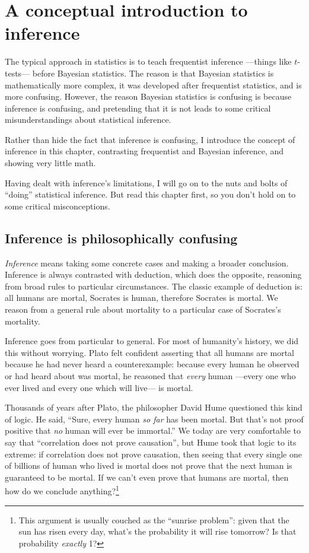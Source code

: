 
\chapter{A conceptual introduction to inference}

The typical approach in statistics is to teach frequentist inference ---things like $t$-tests--- before Bayesian statistics. The reason is that Bayesian statistics is mathematically more complex, it was developed after frequentist statistics, and is more confusing. However, the reason Bayesian statistics is confusing is because inference is confusing, and pretending that it is not leads to some critical misunderstandings about statistical inference.

Rather than hide the fact that inference is confusing, I introduce the concept of inference in this chapter, contrasting frequentist and Bayesian inference, and showing very little math.

Having dealt with inference's limitations, I will go on to the nuts and bolts of ``doing'' statistical inference. But read this chapter first, so you don't hold on to some critical misconceptions.

\section{Inference is philosophically confusing}

\emph{Inference} means taking some concrete cases and making a broader
conclusion. Inference is always contrasted with deduction, which does the
opposite, reasoning from broad rules to particular circumstances. The classic
example of deduction is: all humans are mortal, Socrates is human, therefore
Socrates is mortal. We reason from a general rule about mortality to
a particular case of Socrates's mortality.

Inference goes from particular to general. For most of humanity's history, we
did this without worrying. Plato felt confident asserting that all humans are
mortal because he had never heard a counterexample: because every human he
observed or had heard about was mortal, he reasoned that \emph{every} human ---every one who ever lived and every one which will live--- is mortal.

Thousands of years after Plato, the philosopher David Hume questioned this kind of logic. He said, ``Sure, every human \emph{so far} has been mortal. But that's not proof positive that \emph{no} human will ever be immortal.'' We today are very comfortable to say that ``correlation does not prove causation'', but Hume took that logic to its extreme: if correlation does not prove causation, then seeing that every single one of billions of human who lived is mortal does not prove that the next human is guaranteed to be mortal. If we can't even prove that humans are mortal, then how do we conclude anything?\footnote{This argument is usually couched as the ``sunrise problem'': given that the sun has risen every day, what's the probability it will rise tomorrow? Is that probability \emph{exactly} 1?}

